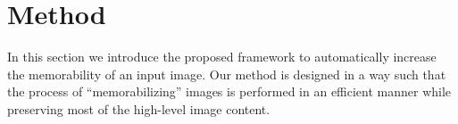 \documentclass{sig-alternate-05-2015}
\begin{document}


\section{Method}

In this section we introduce the proposed framework to automatically increase the memorability of an input image. Our method is designed in a way such that the process of ``memorabilizing'' images is performed in an efficient manner while preserving most of the high-level image content. %
\end{document}
